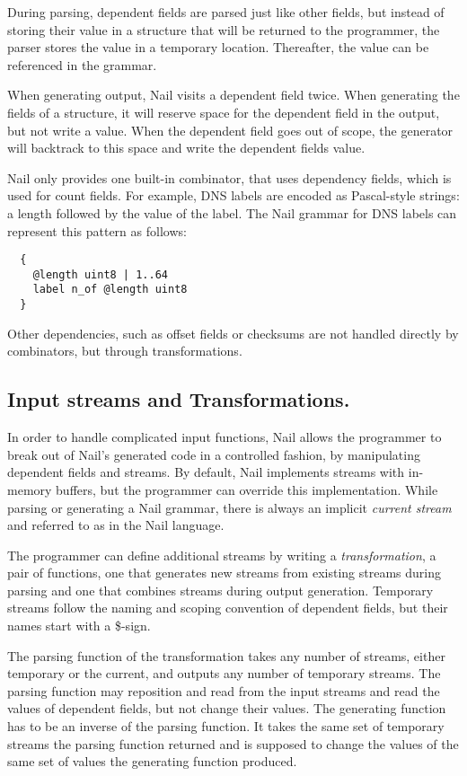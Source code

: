 During parsing, dependent fields are parsed just like other fields, but instead of storing their
value in a structure that will be returned to the programmer, the parser stores the value in a
temporary location. Thereafter, the value can be referenced in the grammar. 

When generating output, Nail visits a dependent field twice. When generating the fields of a
structure, it will reserve space for the dependent field in the output, but not write a value. When
the dependent field goes out of scope, the generator will backtrack to this space and write the
dependent fields value.

Nail only provides one built-in combinator,  that uses dependency fields, which is used
for count fields. For example, DNS labels are encoded as Pascal-style strings: a length followed by
the value of the label. The Nail grammar for DNS labels can represent
this pattern as follows:

{
\smaller[0.5]
\begin{verbatim}
  {
    @length uint8 | 1..64
    label n_of @length uint8
  }
\end{verbatim}
}

Other dependencies, such as offset fields or checksums are not handled directly by combinators, but
through  transformations.

\subsection{Input streams and Transformations.}

In order to handle complicated input functions, Nail allows the programmer to
break out of Nail's generated code in a controlled fashion, by manipulating dependent fields and
streams. 
By default, Nail implements streams with in-memory buffers, but the programmer can override this implementation.
While parsing or generating a Nail grammar, there is always an implicit \emph{current stream} and
referred to as  in the Nail language.

The programmer can define additional streams by writing a \emph{transformation}, a pair of
functions, one that generates new streams from existing streams during parsing and one that
combines streams during output generation. Temporary streams follow the naming and
scoping convention of dependent fields, but their names start with a \$-sign. 


The parsing function of the transformation takes any number of streams, either temporary or the current,
and outputs any number of temporary streams. The parsing function may reposition and read from the
input streams and read the values of dependent fields, but not change their values. The generating
function has to be an inverse of the parsing function. It takes the same set of temporary streams
the parsing function returned and is supposed to change the values of the same set of values the
generating function produced.

